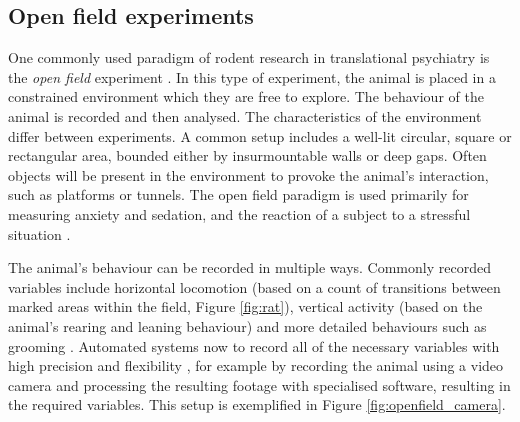 \documentclass[conference,a4paper,twoside]{IEEEtran}
\begin{document}
\subsection{Open field experiments}
\label{sec:intro_openfield}
One commonly used paradigm of rodent research in translational psychiatry is the \emph{open field} experiment \cite{prut2003open}. In this type of experiment, the animal is placed in a constrained environment which they are free to explore. The behaviour of the animal is recorded and then analysed. The characteristics of the environment differ between experiments. A common setup includes a well-lit circular, square or rectangular area, bounded either by insurmountable walls or deep gaps. Often objects will be present in the environment to provoke the animal's interaction, such as platforms or tunnels. The open field paradigm is used primarily for measuring anxiety and sedation, and the reaction of a subject to a stressful situation \cite{prut2003open}.


The animal's behaviour can be recorded in multiple ways. Commonly recorded variables include horizontal locomotion (based on a count of transitions between marked areas within the field, Figure \ref{fig:rat}), vertical activity (based on the animal's rearing and leaning behaviour) and more detailed behaviours such as grooming \cite{prut2003open}. Automated systems now to record all of the necessary variables with high precision and flexibility \cite{delcourt2006comparing}, for example by recording the animal using a video camera and processing the resulting footage with specialised software, resulting in the required variables. This setup is exemplified in Figure \ref{fig:openfield_camera}.
\end{document}
